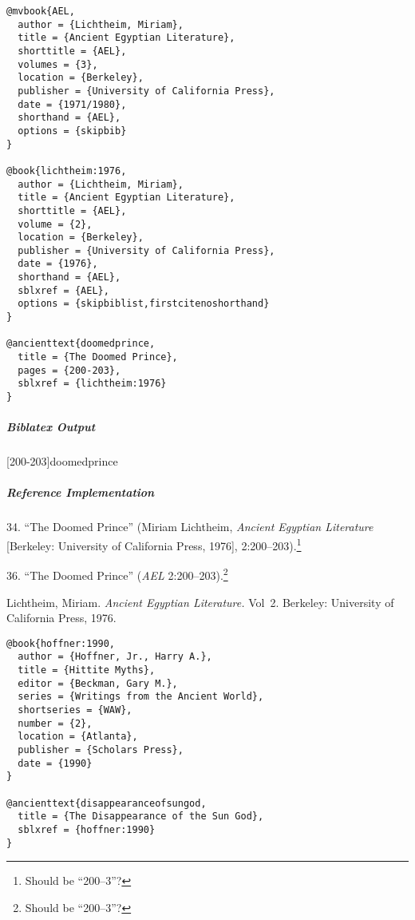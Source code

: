 \documentclass[a4paper]{article}
\newenvironment{biboutput}{%
  \subparagraph{Biblatex Output}
}{\color{black}}
\newenvironment{refimp}{%
  \subparagraph{Reference Implementation}
  \color{reference-colour}
  \rm
}{\par\color{black}}
\begin{document}
\begin{lstlisting}
@mvbook{AEL,
  author = {Lichtheim, Miriam},
  title = {Ancient Egyptian Literature},
  shorttitle = {AEL},
  volumes = {3},
  location = {Berkeley},
  publisher = {University of California Press},
  date = {1971/1980},
  shorthand = {AEL},
  options = {skipbib}
}

@book{lichtheim:1976,
  author = {Lichtheim, Miriam},
  title = {Ancient Egyptian Literature},
  shorttitle = {AEL},
  volume = {2},
  location = {Berkeley},
  publisher = {University of California Press},
  date = {1976},
  shorthand = {AEL},
  sblxref = {AEL},
  options = {skipbiblist,firstcitenoshorthand}
}

@ancienttext{doomedprince,
  title = {The Doomed Prince},
  pages = {200-203},
  sblxref = {lichtheim:1976}
}
\end{lstlisting}

\begin{biboutput}
  [200-203]{doomedprince}
\end{biboutput}

\begin{refimp}
  \hspace*{\bibindent}34. “The Doomed Prince” (Miriam Lichtheim, \emph{Ancient
  Egyptian Literature} [Berkeley: University of California Press, 1976],
  2:200–203).\footnote{Should be “200–3”?}
  
  \hspace*{\bibindent}36. “The Doomed Prince” (\emph{AEL}
  2:200–203).\footnote{Should be “200–3”?}
  
  \hangindent \bibindent Lichtheim, Miriam. \emph{Ancient Egyptian
  Literature.} Vol~2. Berkeley: University of California Press, 1976.

\end{refimp}

\medskip

\begin{lstlisting}
@book{hoffner:1990,
  author = {Hoffner, Jr., Harry A.},
  title = {Hittite Myths},
  editor = {Beckman, Gary M.},
  series = {Writings from the Ancient World},
  shortseries = {WAW},
  number = {2},
  location = {Atlanta},
  publisher = {Scholars Press},
  date = {1990}
}

@ancienttext{disappearanceofsungod,
  title = {The Disappearance of the Sun God},
  sblxref = {hoffner:1990}
}
\end{lstlisting}
\end{document}
